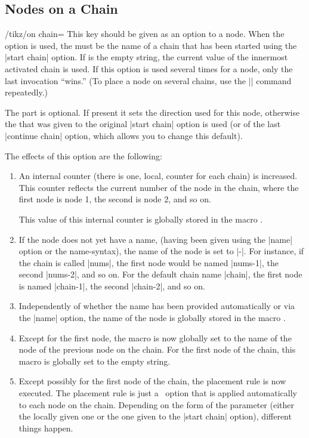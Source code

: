 \subsection{Nodes on a Chain}

\begin{key}{/tikz/on chain=}
  This key should be given as an option to a node. When the option is
  used, the  must be the name of a chain that has
  been started using the |start chain| option. If  is
  the empty string, the current value of the innermost activated chain
  is used. If this option is used several times for a node, only the
  last invocation ``wins.'' (To place a node on several chains, use
  the |\chainin| command repeatedly.)

  The  part is optional. If present it sets the
  direction used for this node, otherwise the 
  that was given to the original |start chain| option is used (or of
  the last |continue chain| option, which allows you to change this
  default). 

  The effects of this option are the following:
  \begin{enumerate}
  \item An internal counter (there is one, local, counter
    for each chain) is increased. This counter reflects the current
    number of the node in the chain, where the first node is node 1,
    the second is node 2, and so on.

    This value of this internal counter is globally stored in the
    macro \declare{|\tikzchaincount|}.
  \item If the node does not yet have a name, (having been given using
    the |name| option or the name-syntax), the name of the node is set to
    |-|. For instance, if the chain is called |nums|, the first
    node would be named |nums-1|, the second |nums-2|, and so on. For
    the default chain name |chain|, the first node is named |chain-1|,
    the second |chain-2|, and so on.
  \item Independently of whether the name has been provided
    automatically or via the |name| option, the name of the node is
    globally stored in the macro \declare{|\tikzchaincurrent|}.
  \item Except for the first node, the macro
    \declare{|\tikzchainprevious|} is now globally set to the name of
    the node of the previous node on the chain. For the first node of
    the chain, this macro is globally set to the empty string.
  \item Except possibly for the first node of the chain, the placement
    rule is now executed. The placement rule is just a \tikzname\ option
    that is applied automatically to each node on the chain. Depending
    on the form of the  parameter (either the locally
    given one or the one given to the |start chain| option), different
    things happen.


\end{enumerate}
\end{key}
